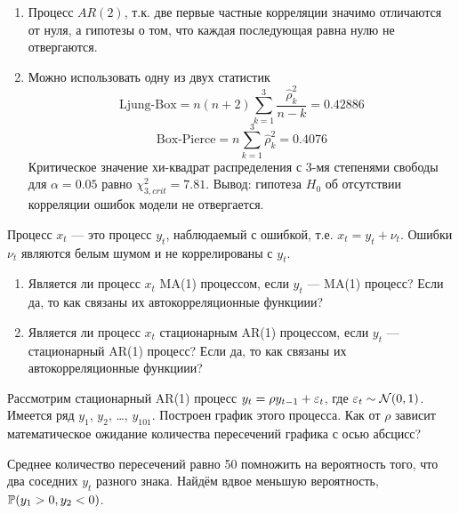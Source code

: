 \begin{problem}
\begin{sol}
\begin{enumerate}
\item Процесс $AR(2)$, т.к. две первые частные корреляции значимо отличаются от нуля, а гипотезы о том, что каждая последующая равна нулю не отвергаются.
\item Можно использовать одну из двух статистик
\[
\text{Ljung-Box}=n(n+2)\sum_{k=1}^3\frac{\hat{\rho}_k^2}{n-k}=
0.42886
\]
\[
\text{Box-Pierce}=n\sum_{k=1}^3\hat{\rho}_k^2=
0.4076
\]
Критическое значение хи-квадрат распределения с 3-мя степенями свободы для $\alpha=0.05$ равно $\chi^2_{3,crit}=7.81$.
Вывод: гипотеза $H_0$ об отсутствии корреляции ошибок модели не отвергается.
\end{enumerate}
\end{sol}
\end{problem}




\begin{problem}
Процесс $x_t$ — это процесс $y_t$, наблюдаемый с ошибкой, т.е. $x_t=y_t+\nu_t$. 
Ошибки $\nu_t$ являются белым шумом и не коррелированы с $y_t$.
\begin{enumerate}
\item Является ли процесс $x_t$ MA(1) процессом, если $y_t$ —  MA(1) процесс? 
Если да, то как связаны их автокорреляционные функциии?
\item Является ли процесс $x_t$ стационарным AR(1) процессом, если $y_t$ —  стационарный AR(1) процесс? 
Если да, то как связаны их автокорреляционные функциии?
\end{enumerate}


\begin{sol}

\end{sol}
\end{problem}


\begin{problem}
Рассмотрим стационарный AR(1) процесс $y_t=\rho y_{t-1} + \e_t$, где $\e_t \sim \cN(0,1)$. 
Имеется ряд $y_1$, $y_2$, \ldots, $y_{101}$. Построен график этого процесса. 
Как от $\rho$ зависит математическое ожидание количества пересечений графика с осью абсцисс?


\begin{sol}
Среднее количество пересечений равно 50 помножить на вероятность того, что два соседних $y_t$ разного знака. 
Найдём вдвое меньшую вероятность, $\P(y_1>0, y_2 <0)$.
\end{sol}
\end{problem}




